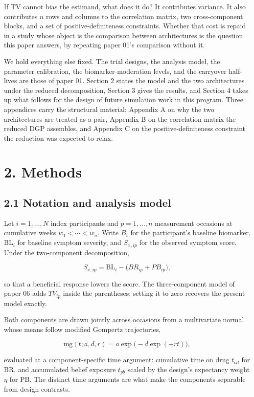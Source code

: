 \documentclass[
  11pt,
]{article}
\begin{document}
If TV cannot bias the estimand, what does it do? It contributes
variance. It also contributes \(n\) rows and columns to the correlation
matrix, two cross-component blocks, and a set of
positive-definiteness constraints. Whether that cost is repaid in a
study whose object is the comparison between architectures is the
question this paper answers, by repeating paper 01's comparison
without it.

We hold everything else fixed. The trial designs, the analysis model,
the parameter calibration, the biomarker-moderation levels, and the
carryover half-lives are those of paper 01. Section 2 states the
model and the two architectures under the reduced decomposition,
Section 3 gives the results, and Section 4 takes up what follows for
the design of future simulation work in this program. Three
appendices carry the structural material: Appendix A on why the two
architectures are treated as a pair, Appendix B on the correlation
matrix the reduced DGP assembles, and Appendix C on the
positive-definiteness constraint the reduction was expected to
relax.

\section{2. Methods}

\subsection{2.1 Notation and analysis model}

Let \(i = 1, \dots, N\) index participants and \(p = 1, \dots, n\)
measurement occasions at cumulative weeks \(w_1 < \cdots < w_n\). Write
\(B_i\) for the participant's baseline biomarker, \(\mathrm{BL}_i\) for
baseline symptom severity, and \(S_{x,ip}\) for the observed symptom
score. Under the two-component decomposition,

\[
S_{x,ip} = \mathrm{BL}_i - \big( BR_{ip} + PB_{ip} \big),
\]

so that a beneficial response lowers the score. The three-component
model of paper 06 adds \(TV_{ip}\) inside the parentheses; setting it
to zero recovers the present model exactly.

Both components are drawn jointly across occasions from a
multivariate normal whose means follow modified Gompertz
trajectories,

\[
\mathrm{mg}(t; a, d, r) = a \exp\!\big(-d \exp(-r t)\big),
\]

evaluated at a component-specific time argument: cumulative time on
drug \(t_{od}\) for BR, and accumulated belief exposure \(t_{pb}\) scaled
by the design's expectancy weight \(\eta\) for PB. The distinct time
arguments are what make the components separable from design
contrasts.
\end{document}
